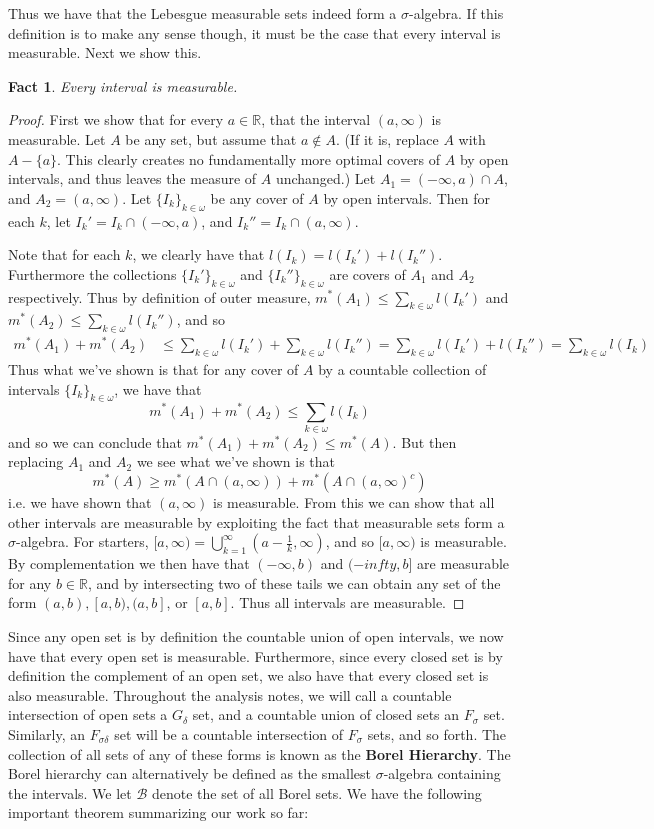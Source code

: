 \documentclass{article}
\theoremstyle{definition}
\theoremstyle{plain}
\theoremstyle{theorem}
\newtheorem{fact}{Fact}[section]
\begin{document}
Thus we have that the Lebesgue measurable sets indeed form a $\sigma$-algebra. If this definition is to make any sense though, it must be the case that every interval is measurable. Next we show this.
\begin{fact}
	Every interval is measurable.
\end{fact}
\begin{proof}
	First we show that for every $a \in \mathbb{R}$, that the interval $(a,\infty)$ is measurable. Let $A$ be any set, but assume that $a \notin A$. (If it is, replace $A$ with $A - \{a\}$. This clearly creates no fundamentally more optimal covers of $A$ by open intervals, and thus leaves the measure of $A$ unchanged.) Let $A_1 = (-\infty,a) \cap A$, and $A_2 = (a,\infty)$. Let $\{I_k\}_{k \in \omega}$ be any cover of $A$ by open intervals. Then for each $k$, let $I_k' = I_k \cap (-\infty,a)$, and $I_k'' = I_k \cap (a,\infty)$.
	
	 Note that for each $k$, we clearly have that $l(I_k) = l(I_k')+l(I_k'')$. Furthermore the collections $\{I_k'\}_{k \in \omega}$ and $\{I_k''\}_{k \in \omega}$ are covers of $A_1$ and $A_2$ respectively. Thus by definition of outer measure, $m^*(A_1) \leq \sum_{k \in \omega} l(I_k')$ and $m^*(A_2) \leq \sum_{k \in \omega} l(I_k'')$, and so 
\begin{align*}
	m^*(A_1)+m^*(A_2) &\leq \sum_{k \in \omega} l(I_k') + \sum_{k \in \omega} l(I_k'') = \sum_{k \in \omega}l(I_k')+l(I_k'') = \sum_{k \in \omega} l(I_k)
\end{align*}
Thus what we've shown is that for any cover of $A$ by a countable collection of intervals $\{I_k\}_{k \in \omega}$, we have that
\[ m^*(A_1)+m^*(A_2) \leq \sum_{k \in \omega} l(I_k) \]
and so we can conclude that $m^*(A_1) + m^*(A_2) \leq m^*(A)$. But then replacing $A_1$ and $A_2$ we see what we've shown is that 
\[ m^*(A) \geq m^*(A \cap (a,\infty)) + m^*(A \cap (a,\infty)^c) \]
i.e. we have shown that $(a,\infty)$ is measurable. From this we can show that all other intervals are measurable by exploiting the fact that measurable sets form a $\sigma$-algebra. For starters, $[a,\infty) = \bigcup_{k=1}^{\infty} (a-\frac{1}{k},\infty)$, and so $[a,\infty)$ is measurable. By complementation we then have that $(-\infty,b)$ and $(-infty,b]$ are measurable for any $b \in \mathbb{R}$, and by intersecting two of these tails we can obtain any set of the form $(a,b),[a,b),(a,b]$, or $[a,b]$. Thus all intervals are measurable. 
\end{proof}
Since any open set is by definition the countable union of open intervals, we now have that every open set is measurable. Furthermore, since every closed set is by definition the complement of an open set, we also have that every closed set is also measurable. Throughout the analysis notes, we will call a countable intersection of open sets a $G_{\delta}$ set, and a countable union of closed sets an $F_{\sigma}$ set. Similarly, an $F_{\sigma \delta}$ set will be a countable intersection of $F_{\sigma}$ sets, and so forth. The collection of all sets of any of these forms is known as the \textbf{Borel Hierarchy}. The Borel hierarchy can alternatively be defined as the smallest $\sigma$-algebra containing the intervals. We let $\mathcal{B}$ denote the set of all Borel sets. We have the following important theorem summarizing our work so far:
\end{document}
